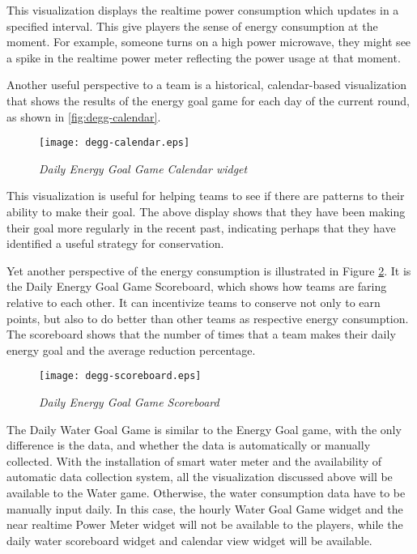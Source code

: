 This visualization displays the realtime power consumption which updates in a specified interval. This give players the sense of energy consumption at the moment. For example, someone turns on a high power microwave, they might see a spike in the realtime power meter reflecting the power usage at that moment.

Another useful perspective to a team is a historical, calendar-based visualization that shows the results of the energy goal game for each day of the current round, as shown in \autoref{fig:degg-calendar}.

\begin{figure}[!ht]
  \center
  \texttt{[image: degg-calendar.eps]}
  \caption{\em Daily Energy Goal Game Calendar widget}
  \label{fig:degg-calendar}
\end{figure}

This visualization is useful for helping teams to see if there are patterns to their ability to make their goal. The above display shows that they have been making their goal more regularly in the recent past, indicating perhaps that they have identified a useful strategy for conservation.

Yet another perspective of the energy consumption is illustrated in Figure \ref{fig:degg-scoreboard}. It is the Daily Energy Goal Game Scoreboard, which shows how teams are faring relative to each other. It can incentivize teams to conserve not only to earn points, but also to do better than other teams as respective energy consumption. The scoreboard shows that the number of times that a team makes their daily energy goal and the average reduction percentage.

\begin{figure}[!ht]
  \center
  \texttt{[image: degg-scoreboard.eps]}
  \caption{\em Daily Energy Goal Game Scoreboard}
  \label{fig:degg-scoreboard}
\end{figure}

The Daily Water Goal Game is similar to the Energy Goal game, with the only difference is the data, and whether the data is automatically or manually collected. With the installation of smart water meter and the availability of automatic data collection system, all the visualization discussed above will be available to the Water game. Otherwise, the water consumption data have to be manually input daily. In this case, the hourly Water Goal Game widget and the near realtime Power Meter widget will not be available to the players, while the daily water scoreboard widget and calendar view widget will be available.

